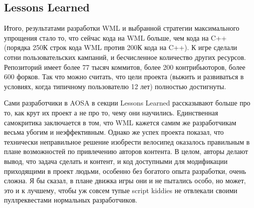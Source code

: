 \documentclass{../../text-style}
\begin{document}
\subsection{Lessons Learned}

Итого, результатами разработки WML и выбранной стратегии максимального упрощения стало то, что сейчас кода на WML больше, чем кода на C++ (порядка 250К строк кода WML против 200К кода на C++). К игре сделали сотни пользовательских кампаний, и бесчисленное количество других ресурсов. Репозиторий имеет более 77 тысяч коммитов, более 200 контрибьюторов, более 600 форков. Так что можно считать, что цели проекта (выжить и развиваться в условиях, когда типичному пользователю 12 лет) полностью достигнуты. 

Сами разработчики в AOSA в секции Lessons Learned рассказывают больше про то, как крут их проект а не про то, чему они научились. Единственная самокритика заключается в том, что WML кажется самим же разработчикам весьма убогим и неэффективным. Однако же успех проекта показал, что технически неправильное решение изобрести велосипед оказалось правильным в плане возможностей по привлечению авторов контента. В целом, авторы делают вывод, что задача сделать и контент, и код доступными для модификации приходящими в проект людьми, особенно без богатого опыта разработки, очень сложна. Я бы сказал, в плане движка игры они и не пытались особо, но может, это и к лучшему, чтобы уж совсем тупые script kiddies не отвлекали своими пуллреквестами нормальных разработчиков.
\end{document}
